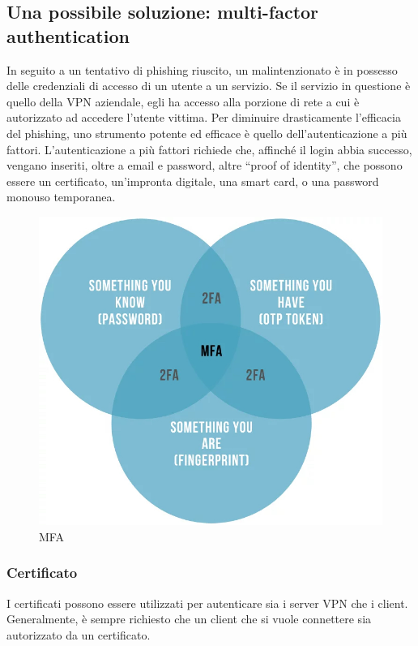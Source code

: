 \subsection{Una possibile soluzione: multi-factor authentication}
In seguito a un tentativo di phishing riuscito, un malintenzionato è in possesso delle credenziali di accesso di un utente a un servizio. Se il servizio in questione è quello della VPN aziendale, egli ha accesso alla porzione di rete a cui è autorizzato ad accedere l'utente vittima.
Per diminuire drasticamente l'efficacia del phishing, uno strumento potente ed efficace è quello dell'autenticazione a più fattori.
L'autenticazione a più fattori richiede che, affinché il login abbia successo, vengano inseriti, oltre a email e password, altre ``proof of identity'', che possono essere un certificato, un'impronta digitale, una smart card, o una password monouso temporanea.

\begin{figure}[ht]
    \centering
    \includegraphics[width=12cm]{figure/mfa.jpeg}
    \caption{MFA}
\end{figure}

\subsubsection{Certificato}

I certificati possono essere utilizzati per autenticare sia i server VPN che i client. Generalmente, è sempre richiesto che un client che si vuole connettere sia autorizzato da un certificato.

